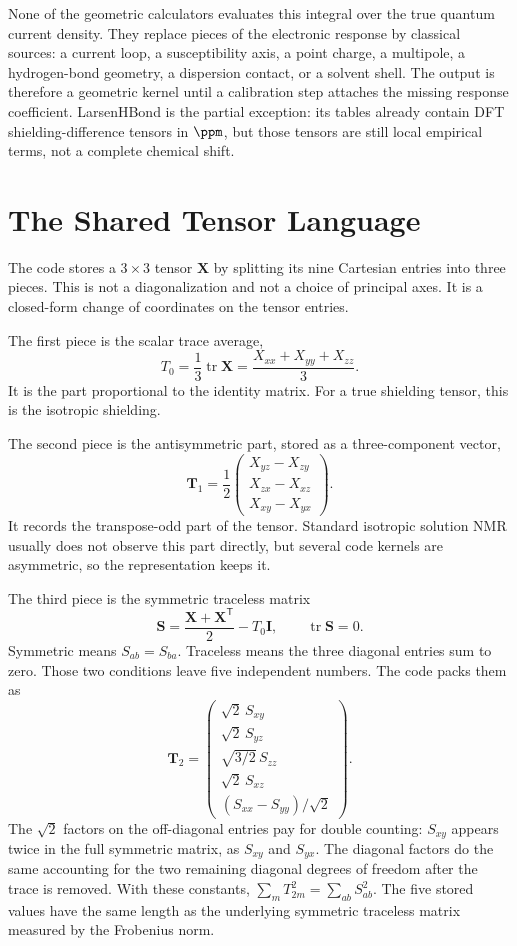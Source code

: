 \documentclass[11pt]{article}
\begin{document}
None of the geometric calculators evaluates this integral over the true quantum
current density. They replace pieces of the electronic response by classical
sources: a current loop, a susceptibility axis, a point charge, a multipole, a
hydrogen-bond geometry, a dispersion contact, or a solvent shell. The output is
therefore a geometric kernel until a calibration step attaches the missing
response coefficient. LarsenHBond is the partial exception: its tables already
contain DFT shielding-difference tensors in \(\si{\ppm}\), but those tensors
are still local empirical terms, not a complete chemical shift.

\section{The Shared Tensor Language}

The code stores a \(3\times3\) tensor \(\bm X\) by splitting its nine Cartesian
entries into three pieces. This is not a diagonalization and not a choice of
principal axes. It is a closed-form change of coordinates on the tensor entries.

The first piece is the scalar trace average,
\[
  T_0=\frac{1}{3}\operatorname{tr}\bm X
  =\frac{X_{xx}+X_{yy}+X_{zz}}{3}.
\]
It is the part proportional to the identity matrix. For a true shielding tensor,
this is the isotropic shielding.

The second piece is the antisymmetric part, stored as a three-component vector,
\[
  \bm T_1 =
  \frac12
  \begin{pmatrix}
    X_{yz}-X_{zy}\\
    X_{zx}-X_{xz}\\
    X_{xy}-X_{yx}
  \end{pmatrix}.
\]
It records the transpose-odd part of the tensor. Standard isotropic solution
NMR usually does not observe this part directly, but several code kernels are
asymmetric, so the representation keeps it.

The third piece is the symmetric traceless matrix
\[
  \bm S=\frac{\bm X+\bm X^{\mathsf T}}{2}-T_0\bm I,
  \qquad
  \operatorname{tr}\bm S=0 .
\]
Symmetric means \(S_{ab}=S_{ba}\). Traceless means the three diagonal entries
sum to zero. Those two conditions leave five independent numbers. The code packs
them as
\[
  \bm T_2 =
  \begin{pmatrix}
    \sqrt2\,S_{xy}\\
    \sqrt2\,S_{yz}\\
    \sqrt{3/2}\,S_{zz}\\
    \sqrt2\,S_{xz}\\
    (S_{xx}-S_{yy})/\sqrt2
  \end{pmatrix}.
\]
The \(\sqrt2\) factors on the off-diagonal entries pay for double counting:
\(S_{xy}\) appears twice in the full symmetric matrix, as \(S_{xy}\) and
\(S_{yx}\). The diagonal factors do the same accounting for the two remaining
diagonal degrees of freedom after the trace is removed. With these constants,
\(\sum_m T_{2m}^2=\sum_{ab}S_{ab}^2\). The five stored values have the same
length as the underlying symmetric traceless matrix measured by the Frobenius
norm.
\end{document}
